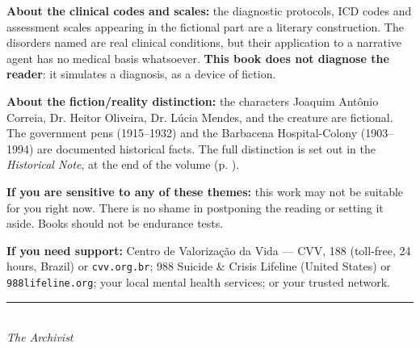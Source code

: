 \noindent \textbf{About the clinical codes and scales:} the diagnostic protocols, ICD codes and assessment scales appearing in the fictional part are a literary construction. The disorders named are real clinical conditions, but their application to a narrative agent has no medical basis whatsoever. \textbf{This book does not diagnose the reader}: it simulates a diagnosis, as a device of fiction.

\vspace{1em}

\noindent \textbf{About the fiction/reality distinction:} the characters Joaquim Antônio Correia, Dr. Heitor Oliveira, Dr. Lúcia Mendes, and the creature are fictional. The government pens (1915--1932) and the Barbacena Hospital-Colony (1903--1994) are documented historical facts. The full distinction is set out in the \textit{Historical Note}, at the end of the volume (p. \pageref{nota-historica}).

\vspace{1em}

\noindent \textbf{If you are sensitive to any of these themes:} this work may not be suitable for you right now. There is no shame in postponing the reading or setting it aside. Books should not be endurance tests.

\vspace{1em}

\noindent \textbf{If you need support:} Centro de Valorização da Vida --- CVV, 188 (toll-free, 24 hours, Brazil) or \texttt{cvv.org.br}; 988 Suicide \& Crisis Lifeline (United States) or \texttt{988lifeline.org}; your local mental health services; or your trusted network.

\vspace{2.2em}
\begin{center}
{\color{sangue}\rule{0.4\paperwidth}{0.6pt}}\\[1em]
{\small\itshape The Archivist}
\end{center}
\endgroup
\null\vfill
\clearpage

